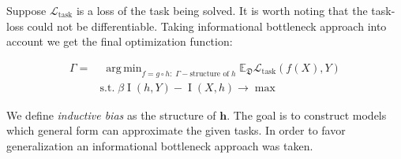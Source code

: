 \documentclass{article}
\DeclareMathOperator*{\argmin}{arg\,min}
\begin{document}
        Suppose \(\mathcal{L}_{\text{task}}\) is a loss of the task being solved. It is worth noting that the task-loss could not be differentiable. Taking informational bottleneck approach into account we get the final optimization function:
    
    
        \begin{align*}
            \Gamma = &\; \argmin_{f = g \circ h: \; \Gamma - \text{structure of} \; h} \mathbb{E}_{\mathfrak{D}} \mathcal{L}_{\text{task}}(f(X), Y) \\ 
            & \text{s.t.} \; \beta \operatorname{I}(h, Y) - \operatorname{I}(X, h) \rightarrow \max
        \end{align*}

        We define \textit{inductive bias} as the structure of \(\mathbf{h}\). The goal is to construct models which general form can approximate the given tasks. In order to favor generalization an informational bottleneck approach was taken. 
\end{document}
